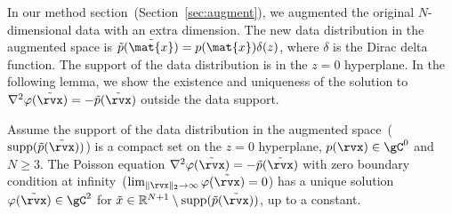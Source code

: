 {In our method section~(Section~\ref{sec:augment}), we augmented the original $N$-dimensional data with an extra dimension. The new data distribution in the augmented space is $\tilde{p}(\tilde{\mat{x}})=p(\mat{x})\delta(z)$, where $\delta$ is the Dirac delta function. The support of the data distribution is in the $z=0$ hyperplane. In the following lemma, we show the existence and uniqueness of the solution to $\nabla^2\varphi(\tilde{\rvx})=-\tilde{p}(\tilde{\rvx})$ outside the data support.}

\begin{lemma}
\label{lemma:data}
{Assume the support of the data distribution in the augmented space~($\textrm{supp}(\tilde{p}(\tilde{\rvx}))$) is a compact set on the $z=0$ hyperplane, $p(\rvx) \in \gC^0$ and  $N\ge 3$. The Poisson equation $\nabla^2\varphi(\tilde{\rvx})=-\tilde{p}(\tilde{\rvx})$ with zero boundary condition at infinity~($\lim_{\parallel \rvx \parallel_2 \to \infty}\varphi(\tilde{\rvx})=0$) has a unique solution $\varphi(\tilde{\rvx}) \in \gC^2$ for $\tilde{x} \in \mathbb{R}^{N+1} \setminus \textrm{supp}(\tilde{p}(\tilde{\rvx}))$, up to a constant.}
\end{lemma}
